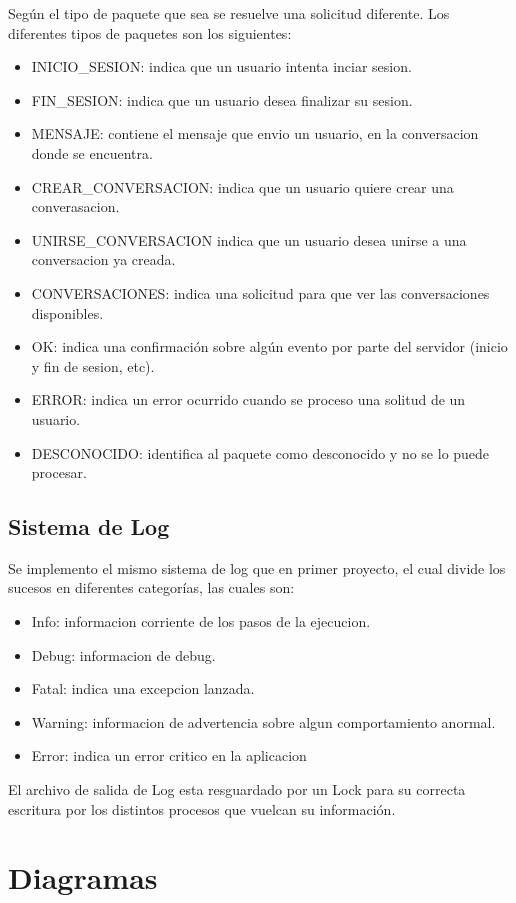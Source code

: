 \documentclass[a4paper,12pt,titlepage]{article}
\begin{document}
Según el tipo de paquete que sea se resuelve una solicitud diferente. Los diferentes tipos de paquetes son los siguientes:
\begin{itemize}
\item INICIO\_SESION: indica que un usuario intenta inciar sesion.
\item FIN\_SESION: indica que un usuario desea finalizar su sesion.
\item MENSAJE: contiene el mensaje que envio un usuario, en la conversacion donde se encuentra.
\item CREAR\_CONVERSACION: indica que un usuario quiere crear una converasacion.
\item UNIRSE\_CONVERSACION indica que un usuario desea unirse a una conversacion ya creada.
\item CONVERSACIONES: indica una solicitud para que ver las conversaciones disponibles.
\item OK: indica una confirmación sobre algún evento por parte del servidor (inicio y fin de sesion, etc).
\item ERROR: indica un error ocurrido cuando se proceso una solitud de un usuario.
\item DESCONOCIDO: identifica al paquete como desconocido y no se lo puede procesar.\\
\end{itemize}

\subsection{Sistema de Log}

Se implemento el mismo sistema de log que en primer proyecto, el cual divide los sucesos en diferentes categorías, las cuales son:
\begin{itemize}
\item Info: informacion corriente de los pasos de la ejecucion.
\item Debug: informacion de debug.
\item Fatal: indica una excepcion lanzada.
\item Warning: informacion de advertencia sobre algun comportamiento anormal.
\item Error: indica un error critico en la aplicacion
\end{itemize}
El archivo de salida de Log esta resguardado por un Lock para su correcta escritura por los distintos procesos que vuelcan su información.

\newpage
\section{Diagramas}
\end{document}
